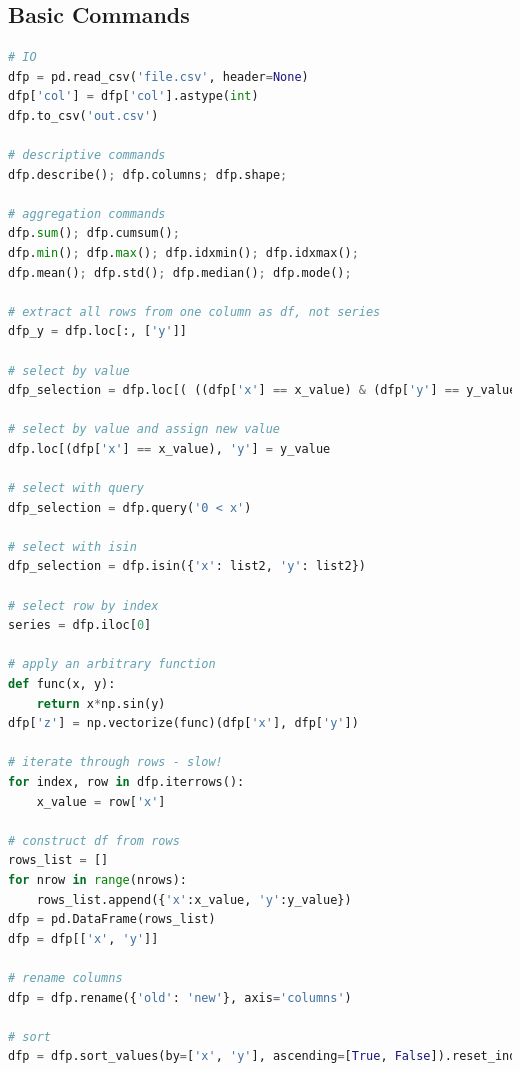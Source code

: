 \chapter{\pandas}
\label{pandas}

\section{Basic Commands}
\label{pandas:basic}

\begin{lstlisting}[language=Python]
# IO
dfp = pd.read_csv('file.csv', header=None)
dfp['col'] = dfp['col'].astype(int)
dfp.to_csv('out.csv')

# descriptive commands
dfp.describe(); dfp.columns; dfp.shape;

# aggregation commands
dfp.sum(); dfp.cumsum();
dfp.min(); dfp.max(); dfp.idxmin(); dfp.idxmax();
dfp.mean(); dfp.std(); dfp.median(); dfp.mode();

# extract all rows from one column as df, not series
dfp_y = dfp.loc[:, ['y']]

# select by value
dfp_selection = dfp.loc[( ((dfp['x'] == x_value) & (dfp['y'] == y_value)) | (dfp['z'] < z_value))]

# select by value and assign new value
dfp.loc[(dfp['x'] == x_value), 'y'] = y_value

# select with query
dfp_selection = dfp.query('0 < x')

# select with isin
dfp_selection = dfp.isin({'x': list2, 'y': list2})

# select row by index
series = dfp.iloc[0]

# apply an arbitrary function
def func(x, y):
	return x*np.sin(y)
dfp['z'] = np.vectorize(func)(dfp['x'], dfp['y'])

# iterate through rows - slow!
for index, row in dfp.iterrows():
	x_value = row['x']

# construct df from rows
rows_list = []
for nrow in range(nrows):
	rows_list.append({'x':x_value, 'y':y_value})
dfp = pd.DataFrame(rows_list)
dfp = dfp[['x', 'y']]

# rename columns
dfp = dfp.rename({'old': 'new'}, axis='columns')

# sort
dfp = dfp.sort_values(by=['x', 'y'], ascending=[True, False]).reset_index(drop=True)


\end{lstlisting}
